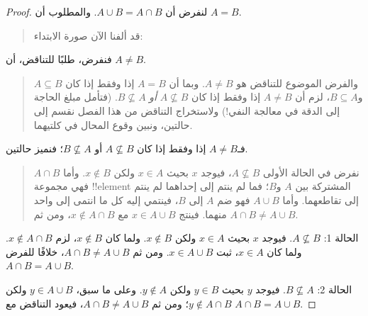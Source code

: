 \documentclass[../../../include/open-logic-section]{subfiles}
\begin{document}
\begin{proof}
  لنفرض أن $A \cup B = A \cap B$. والمطلوب أن $A = B$.
  \begin{quote}
    قد ألفنا الآن صورة الابتداء:
  \end{quote}
  فنفرض، طلبًا للتناقض، أن $A \neq B$.
  \begin{quote}
    والفرض الموضوع للتناقض هو $A \neq B$. وبما أن $A = B$ إذا وفقط
    إذا كان $A \subseteq B$ و$B \subseteq A$، لزم أن
    $A \neq B$ إذا وفقط إذا كان $A \nsubseteq B$ \emph{أو}
    $B \nsubseteq A$. (فتأمل مبلغ الحاجة إلى الدقة في معالجة
    النفي!{}) ولاستخراج التناقض من هذا الفصل نقسم إلى حالتين، ونبين
    وقوع المحال في كلتيهما.
  \end{quote}
  فـ$A \neq B$ إذا وفقط إذا كان $A \nsubseteq B$ أو
  $B \nsubseteq A$؛ فنميز حالتين.
  \begin{quote}
    نفرض في الحالة الأولى $A \nsubseteq B$، فيوجد $x$ بحيث
    $x \in A$ ولكن $x \notin B$. وأما $A \cap B$ فهي مجموعة
    !!{element} المشتركة بين $A$ و$B$؛ فما لم ينتم إلى إحداهما لم
    ينتم إلى تقاطعهما. وأما $A \cup B$ فهو ضم $A$ إلى $B$، فينتمي
    إليه كل ما انتمى إلى واحد منهما. فينتج
    $x \in A \cup B$ مع $x \notin A \cap B$، ومن ثم
    $A \cap B \neq A \cup B$.
  \end{quote}

  الحالة 1: $A \nsubseteq B$. فيوجد $x$ بحيث $x \in A$ ولكن
  $x \notin B$. ولما كان $x \notin B$، لزم $x \notin A \cap B$.
  ولما كان $x \in A$، ثبت $x \in A \cup B$. ومن ثم
  $A \cap B \neq A \cup B$، خلافًا للفرض
  $A \cap B = A \cup B$.

  الحالة 2: $B \nsubseteq A$. فيوجد $y$ بحيث $y \in B$ ولكن
  $y \notin A$. وعلى ما سبق، $y \in A \cup B$ ولكن
  $y \notin A \cap B$؛ ومن ثم $A \cap B \neq A \cup B$، فيعود
  التناقض مع $A \cap B = A \cup B$.
\end{proof}
\end{document}
